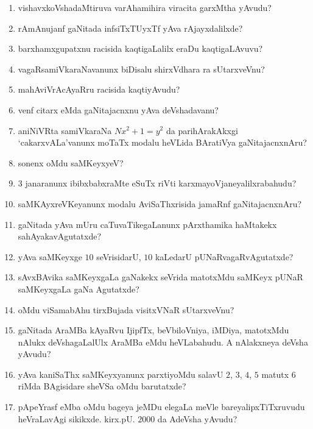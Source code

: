 \begin{enumerate}
\item vishavxkoVshadaMtiruva varAhamihira viracita garxMtha yAvudu?
  
\item rAmAnujanf gaNitada infsiTxTUyxTf yAva rAjayxdalilxde?
  
\item barxhamxgupatxnu racisida kaqtigaLalilx eraDu kaqtigaLAvuvu?

\item vagaRsamiVkaraNavanunx biDisalu shirxVdhara ra sUtarxveVnu?

\item mahAviVrAcAyaRru racisida kaqtiyAvudu?
  
\item venf citarx eMda gaNitajacnxnu yAva deVshadavanu?
  
\item aniNiVRta samiVkaraNa $Nx^2 +1 =y^2$ da parihArakAkxgi `cakarxvALa'vanunx moTaTx modalu heVLida BAratiVya gaNitajacnxnAru?
  
\item sonenx oMdu saMKeyxyeV?
  
\item $3$ janaranunx ibibxbabxraMte eSuTx riVti karxmayoVjaneyalilxrabahudu?
  
\item saMKAyxreVKeyanunx modalu AviSaThxrisida jamaRnf gaNitajacnxnAru?
  
\item gaNitada yAva mUru caTuvaTikegaLanunx pArxthamika haMtakekx sahAyaka\-vAgutatxde?
  
\item yAva saMKeyxge $10$ seVrisidarU, $10$ kaLedarU pUNaRvagaRvAgutatxde?

\item sAvxBAvika saMKeyxgaLa gaNakekx seVrida matotxMdu saMKeyx pUNaR saMKeyxgaLa gaNa Agutatxde?
  
\item oMdu viSamabAhu tirxBujada visitxVNaR sUtarxveVnu?
  
\item gaNitada AraMBa kAyaRvu IjipfTx, beVbiloVniya, iMDiya, matotxMdu nAlukx deVshagaLalUlx AraMBa eMdu heVLabahudu. A nAlakxneya deVsha yAvudu?
  
\item yAva kaniSaThx saMKeyxyanunx parxtiyoMdu  salavU $2$, $3$, $4$, $5$ matutx $6$ riMda BAgisidare sheVSa oMdu barutatxde?
  
\item pApeYrasf eMba oMdu bageya jeMDu elegaLa meVle bareyalipxTiTxruvudu heVraLavAgi sikikxde. kirx.pU. $2000$ da AdeVsha yAvudu?
  

\end{enumerate}

